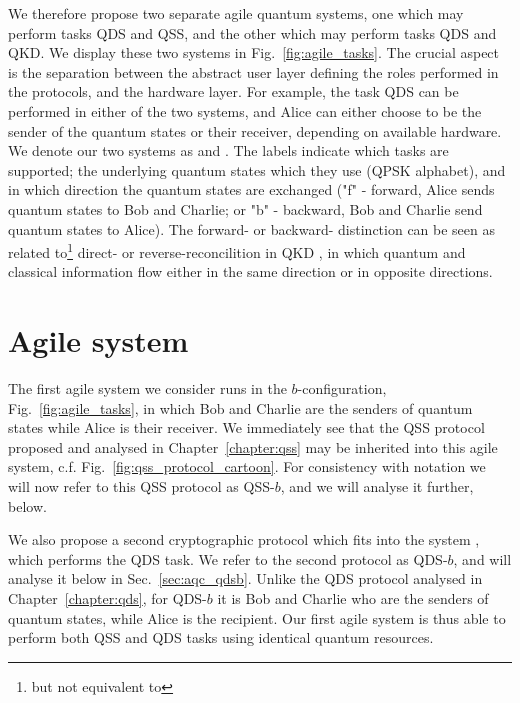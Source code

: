We therefore propose two separate agile quantum systems, one which may perform tasks QDS and QSS, and the other which may perform tasks QDS and QKD. We display these two systems in Fig.~\ref{fig:agile_tasks}. The crucial aspect is the separation between the abstract user layer defining the roles performed in the protocols, and the hardware layer. For example, the task QDS can be performed in either of the two systems, and Alice can either choose to be the sender of the quantum states or their receiver, depending on available hardware. We denote our two systems as \systemB \;and \systemF. The labels indicate which tasks are supported; the underlying quantum states which they use (QPSK alphabet), and in which direction the quantum states are exchanged ("f" - forward, Alice sends quantum states to Bob and Charlie; or "b" - backward, Bob and Charlie send quantum states to Alice). The forward- or backward- distinction can be seen as related to\footnote{but not equivalent to} direct- or reverse-reconcilition in QKD \cite{Laudenbach2017}, in which quantum and classical information flow either in the same direction or in opposite directions.




\section{Agile system \systemB}\label{sec:aqc_systemb}
The first agile system we consider runs in the $b$-configuration, Fig.~\ref{fig:agile_tasks}, in which Bob and Charlie are the senders of quantum states while Alice is their receiver. We immediately see that the QSS protocol proposed and analysed in Chapter~\ref{chapter:qss} may be inherited into this agile system, c.f. Fig.~\ref{fig:qss_protocol_cartoon}. For consistency with notation we will now refer to this QSS protocol as QSS-$b$, and we will analyse it further, below. 

We also propose a second cryptographic protocol which fits into the system \systemB, which performs the QDS task. We refer to the second protocol as QDS-$b$, and will analyse it below in Sec.~\ref{sec:aqc_qdsb}. Unlike the QDS protocol analysed in Chapter~\ref{chapter:qds}, for QDS-$b$ it is Bob and Charlie who are the senders of quantum states, while Alice is the recipient. %
Our first agile system \systemB \; is thus able to perform both QSS and QDS tasks using identical quantum resources. %

